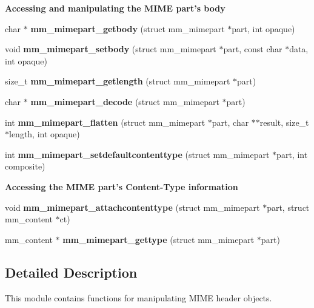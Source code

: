 \begin{Indent}{\bf Accessing and manipulating the MIME part's body}\par
\begin{CompactItemize}
\item 
char $\ast$ {\bf mm\_\-mimepart\_\-getbody} (struct mm\_\-mimepart $\ast$part, int opaque)
\item 
void {\bf mm\_\-mimepart\_\-setbody} (struct mm\_\-mimepart $\ast$part, const char $\ast$data, int opaque)
\item 
size\_\-t {\bf mm\_\-mimepart\_\-getlength} (struct mm\_\-mimepart $\ast$part)
\item 
char $\ast$ {\bf mm\_\-mimepart\_\-decode} (struct mm\_\-mimepart $\ast$part)
\item 
int {\bf mm\_\-mimepart\_\-flatten} (struct mm\_\-mimepart $\ast$part, char $\ast$$\ast$result, size\_\-t $\ast$length, int opaque)
\item 
int {\bf mm\_\-mimepart\_\-setdefaultcontenttype} (struct mm\_\-mimepart $\ast$part, int composite)
\end{CompactItemize}
\end{Indent}
\begin{Indent}{\bf Accessing the MIME part's Content-Type information}\par
\begin{CompactItemize}
\item 
void {\bf mm\_\-mimepart\_\-attachcontenttype} (struct mm\_\-mimepart $\ast$part, struct mm\_\-content $\ast$ct)
\item 
mm\_\-content $\ast$ {\bf mm\_\-mimepart\_\-gettype} (struct mm\_\-mimepart $\ast$part)
\end{CompactItemize}
\end{Indent}


\subsection{Detailed Description}
This module contains functions for manipulating MIME header objects. 